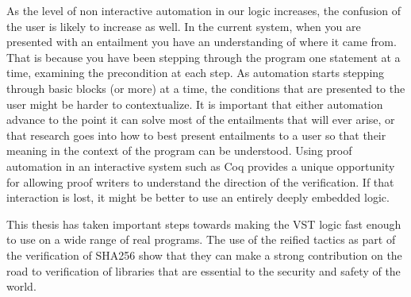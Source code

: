 \documentclass{puthesis}
\begin{document}
As the level of non interactive
automation in our logic increases, the confusion of the user is likely
to increase as well. In the current system, when you are presented
with an entailment you have an understanding of where it came
from. That is because you have been stepping through the program one
statement at a time, examining the precondition at each step. As
automation starts stepping through basic blocks (or more) at a time,
the conditions that are presented to the user might be harder to
contextualize. It is important that either automation advance to the
point it can solve most of the entailments that will ever arise, or
that research goes into how to best present entailments to a user so
that their meaning in the context of the program can be
understood. Using proof automation in an interactive system such as
Coq provides a unique opportunity for allowing proof writers to
understand the direction of the verification. If that interaction is
lost, it might be better to use an entirely deeply embedded logic.

This thesis has taken important steps towards making the VST logic
fast enough to use on a wide range of real programs. The use of the
reified tactics as part of the verification of SHA256 show that they
can make a strong contribution on the road to verification of
libraries that are essential to the security and safety of the world.



\end{document}
